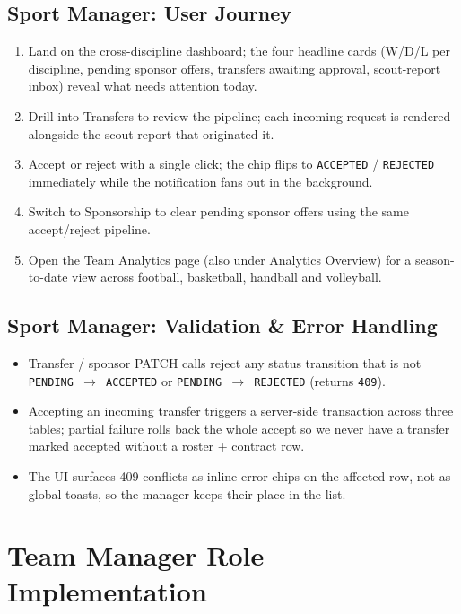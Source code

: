 \documentclass[12pt,a4paper,oneside]{report}
\begin{document}
\subsection*{Sport Manager: User Journey}
\begin{enumerate}[leftmargin=*]
  \item Land on the cross-discipline dashboard; the four headline
        cards (W/D/L per discipline, pending sponsor offers,
        transfers awaiting approval, scout-report inbox) reveal
        what needs attention today.
  \item Drill into Transfers to review the pipeline; each incoming
        request is rendered alongside the scout report that
        originated it.
  \item Accept or reject with a single click; the chip flips to
        \texttt{ACCEPTED} / \texttt{REJECTED} immediately while the
        notification fans out in the background.
  \item Switch to Sponsorship to clear pending sponsor offers using
        the same accept/reject pipeline.
  \item Open the Team Analytics page (also under Analytics
        Overview) for a season-to-date view across football,
        basketball, handball and volleyball.
\end{enumerate}

\subsection*{Sport Manager: Validation \& Error Handling}
\begin{itemize}[leftmargin=*]
  \item Transfer / sponsor PATCH calls reject any status transition
        that is not \texttt{PENDING $\to$ ACCEPTED} or
        \texttt{PENDING $\to$ REJECTED} (returns \texttt{409}).
  \item Accepting an incoming transfer triggers a server-side
        transaction across three tables; partial failure rolls back
        the whole accept so we never have a transfer marked
        accepted without a roster + contract row.
  \item The UI surfaces 409 conflicts as inline error chips on the
        affected row, not as global toasts, so the manager keeps
        their place in the list.
\end{itemize}

\section{Team Manager Role Implementation}
\label{sec:impl-team-manager}
\end{document}
